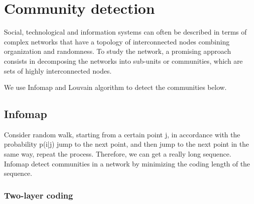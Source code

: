 \documentclass[fleqn,10pt]{SelfArx} %
\begin{document}
	
	\maketitle %
	
	\tableofcontents %
	
	\thispagestyle{empty} %
	
	
	
	
	\section{Community detection}
	Social, technological and information systems can often be described in terms of complex networks that have a topology of interconnected nodes combining organization and randomness. 
	To study the network, a promising approach consists in decomposing the networks into sub-units or communities, which are sets of highly interconnected nodes.
	
	We use Infomap\cite{rosvall2009map} and Louvain algorithm\cite{blondel2008fast} to detect the communities below.
	
		\subsection{Infomap}
	Consider random walk, starting from a certain point j, in accordance with the probability 
	p(i|j) jump to the next point, and then jump to the next point in the same way, repeat the process. Therefore, we can get a really long sequence. Infomap detect communities in a network by minimizing the coding length of the sequence.
	\subsubsection{Two-layer coding}
	
\end{document}
